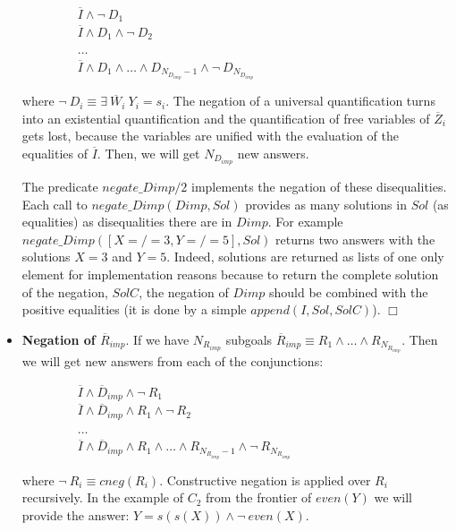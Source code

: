 \documentclass{tlp}
\newcommand{\implementation}[1]{\noindent{\sc Implementation details:}
  #1 $\Box$}
\begin{document}
\begin{itemize}
           $~~~~~~~~~~~~~~~~~~~~\overline{I} \wedge \neg~ D_1 $ \\ 
           $~~~~~~~~~~~~~~~~~~~~\overline{I} \wedge
           D_1 \wedge \neg~ D_2 $ \\ 
           $~~~~~~~~~~~~~~~~~~~~\ldots $ \\ 
           $~~~~~~~~~~~~~~~~~~~~\overline{I} \wedge
           D_1 \wedge \ldots \wedge D_{N_{D_{imp}}-1} \wedge \neg~
           D_{N_{D_{imp}}}$ 

           where $ \neg~ D_i \equiv \exists~
           \overline{W}_i~ Y_i = s_i$. The negation of a universal
           quantification turns into an existential quantification and
           the quantification of free variables of $\overline{Z}_i$
           gets lost, because the variables are unified with the evaluation of
           the equalities of $\overline{I}$. Then, we will get
           $N_{D_{imp}}$ new answers.

\implementation{
The predicate $negate\_Dimp/2$ implements the
negation of these disequalities. Each call to $negate\_Dimp(Dimp,Sol)$
provides as many solutions in $Sol$ (as equalities) as disequalities there
are in $Dimp$. For example $negate\_Dimp([X=/=3,Y=/=5],Sol)$ returns two
answers with the solutions $X=3$ and $Y=5$. Indeed, solutions are returned
as lists of one only element for implementation reasons because to return the
complete solution of the negation, $SolC$, the negation of $Dimp$ should be
combined with the positive equalities (it is done by a simple
$append(I,Sol,SolC)$).
}

           \item {\bf Negation of $\overline{R}_{imp}$}. If we have
           $N_{R_{imp}}$ subgoals $\overline{R}_{imp} \equiv R_1 \wedge \ldots
           \wedge R_{N_{R_{imp}}}$. Then we will get new answers from each of
           the conjunctions:

           $~~~~~~~~~~~~~~~~~~~~\overline{I} \wedge \overline{D}_{imp} \wedge \neg~ R_1 $ \\ 
           $~~~~~~~~~~~~~~~~~~~~\overline{I} \wedge \overline{D}_{imp} \wedge
           R_1 \wedge \neg~ R_2 $ \\ 
           $~~~~~~~~~~~~~~~~~~~~\ldots $ \\ 
           $~~~~~~~~~~~~~~~~~~~~\overline{I} \wedge \overline{D}_{imp} \wedge
           R_1 \wedge \ldots \wedge R_{N_{R_{imp}}-1} \wedge \neg~
           R_{N_{R_{imp}}}$ 

           where $ \neg~ R_i \equiv cneg(R_i)$. Constructive negation is
           applied over $R_i$ recursively.
           In the example of $C_2$ from the frontier of $even(Y)$ we will
           provide the answer: $Y = s(s(X)) \wedge \neg~even(X)$.


\end{itemize}
\end{document}
